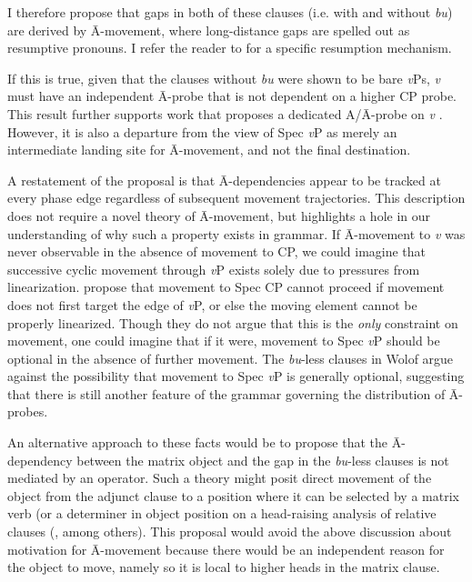 \documentclass[output=paper]{langscibook}
\begin{document}
I therefore propose that gaps in both of these clauses (i.e. with and without \emph{bu}) are derived by \={A}-movement, where long-distance gaps are spelled out as resumptive pronouns. I refer the reader to \citet{sichel:2014} for a specific resumption mechanism. 

If this is true, given that the clauses without \emph{bu} were shown to be bare \textit{v}Ps, \textit{v} must have an independent \={A}-probe that is not dependent on a higher CP probe. This result further supports work that proposes a dedicated A/\={A}-probe on \textit{v} \citep{vanurkrichards:2015,longenbaugh:2917}. However, it is also a departure from the view of Spec \textit{v}P as merely an intermediate landing site for \={A}-movement, and not the final destination. 

A restatement of the proposal is that \={A}-dependencies appear to be tracked at every phase edge regardless of subsequent movement trajectories. This description does not require a novel theory of \={A}-movement, but highlights a hole in our understanding of why such a property exists in grammar. If \={A}-movement to \textit{v} was never observable in the absence of movement to CP, we could imagine that successive cyclic movement through \textit{v}P exists solely due to pressures from linearization. \citet{foxpes:2005} propose that movement to Spec CP cannot proceed if movement does not first target the edge of \textit{v}P, or else the moving element cannot be properly linearized. Though they do not argue that this is the \emph{only} constraint on movement, one could imagine that if it were, movement to Spec \textit{v}P should be optional in the absence of further movement. The \emph{bu}-less clauses in Wolof argue against the possibility that movement to Spec \textit{v}P is generally optional, suggesting that there is still another feature of the grammar governing the distribution of \={A}-probes.

An alternative approach to these facts would be to propose that the \={A}-de\-pen\-den\-cy between the matrix object and the gap in the \emph{bu}-less clauses is not mediated by an operator. Such a theory might posit direct movement of the object from the adjunct clause to a position where it can be selected by a matrix verb (or a determiner in object position on a head-raising analysis of relative clauses (\citealt{kayne:1994,bianchi:1999}, among others). This proposal would avoid the above discussion about motivation for \={A}-movement because there would be an independent reason for the object to move, namely so it is local to higher heads in the matrix clause.
\end{document}
